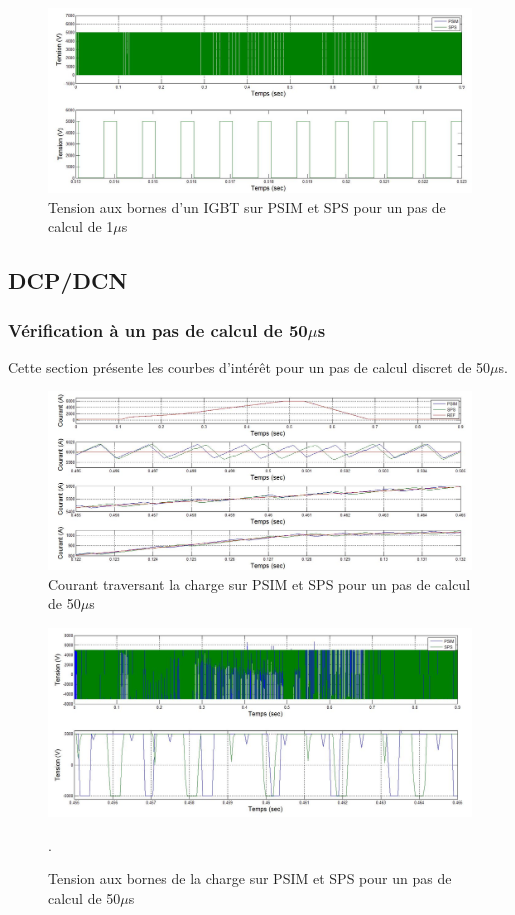 \documentclass[11pt,letterpaper,final]{report}
\begin{document}
\begin{figure}[htb]
\centering
\includegraphics[scale=0.5]{Fig/Hacheur4Quadrants/HacheurTensionIGBT1u.jpg}
\caption{Tension aux bornes d'un IGBT sur PSIM et SPS pour un pas de calcul de 1$\mu$s}
\label{hc_IG_ten_1}
\end{figure}


\clearpage

\subsection{DCP/DCN}

\subsubsection{Vérification à un pas de calcul de 50$\mu$s}
Cette section présente les courbes d'intérêt pour un pas de calcul discret de 50$\mu$s.


\begin{figure}[htb]
\centering
\includegraphics[scale=0.5]{Fig/DCPDCN/DCPCourantCharge50u.jpg}
\caption{Courant traversant la charge sur PSIM et SPS pour un pas de calcul de 50$\mu$s}
\label{DC_ch_cou_50}
\end{figure}


\begin{figure}[htb]
\centering
\includegraphics[scale=0.5]{Fig/DCPDCN/DCPTensionCharge50u.jpg}
\caption{Tension aux bornes de la charge sur PSIM et SPS pour un pas de calcul de 50$\mu$s}.
\label{DC_ch_ten_50}
\end{figure}
\end{document}
